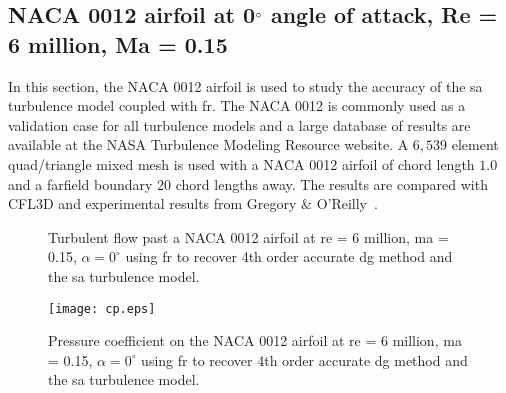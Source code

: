 \graphicspath{{\aiaadir /figures_RANS_naca0012/}}%

\subsection{NACA 0012 airfoil at 0$^{\circ}$ angle of attack, Re = 6 million, Ma = 0.15}
In this section, the NACA 0012 airfoil is used to study the accuracy of the \gls{sa} turbulence model coupled with \gls{fr}. The NACA 0012 is commonly used as a validation case for all turbulence models and a large database of results are available at the NASA Turbulence Modeling Resource website. A $6,539$ element quad/triangle mixed mesh is used with a NACA 0012 airfoil of chord length $1.0$ and a farfield boundary $20$ chord lengths away. The results are compared with CFL3D and experimental results from Gregory \& O'Reilly~\cite{gregory1973low}.

\begin{figure}


  \caption{Turbulent flow past a NACA 0012 airfoil at \gls{re} = 6 million, \gls{ma} = 0.15, $\alpha = 0^{\circ}$ using \gls{fr} to recover 4th order accurate \gls{dg} method and the \gls{sa} turbulence model.}
  \label{RANS_naca0012}
\end{figure}

\begin{figure}
\centering
  \texttt{[image: cp.eps]}
  \caption{Pressure coefficient on the NACA 0012 airfoil at \gls{re} = 6 million, \gls{ma} = 0.15, $\alpha = 0^{\circ}$ using \gls{fr} to recover 4th order accurate \gls{dg} method and the \gls{sa} turbulence model.}
  \label{RANS_naca0012_cp}
\end{figure}

